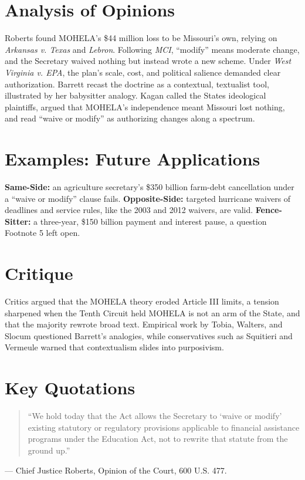 \documentclass[12pt]{article}
\begin{document}
\section{Analysis of Opinions}
Roberts found MOHELA's \$44 million loss to be Missouri's own, relying on \textit{Arkansas v. Texas} and \textit{Lebron}. Following \textit{MCI}, ``modify'' means moderate change, and the Secretary waived nothing but instead wrote a new scheme. Under \textit{West Virginia v. EPA}, the plan's scale, cost, and political salience demanded clear authorization. Barrett recast the doctrine as a contextual, textualist tool, illustrated by her babysitter analogy. Kagan called the States ideological plaintiffs, argued that MOHELA's independence meant Missouri lost nothing, and read ``waive or modify'' as authorizing changes along a spectrum.

\section{Examples: Future Applications}
\textbf{Same-Side:} an agriculture secretary's \$350 billion farm-debt cancellation under a ``waive or modify'' clause fails. \textbf{Opposite-Side:} targeted hurricane waivers of deadlines and service rules, like the 2003 and 2012 waivers, are valid. \textbf{Fence-Sitter:} a three-year, \$150 billion payment and interest pause, a question Footnote 5 left open.

\section{Critique}
Critics argued that the MOHELA theory eroded Article III limits, a tension sharpened when the Tenth Circuit held MOHELA is not an arm of the State, and that the majority rewrote broad text. Empirical work by Tobia, Walters, and Slocum questioned Barrett's analogies, while conservatives such as Squitieri and Vermeule warned that contextualism slides into purposivism.

\section{Key Quotations}
\begin{quote}
``We hold today that the Act allows the Secretary to `waive or modify' existing statutory or regulatory provisions applicable to financial assistance programs under the Education Act, not to rewrite that statute from the ground up.''
\end{quote}
\noindent --- Chief Justice Roberts, Opinion of the Court, 600 U.S. 477.
\end{document}
